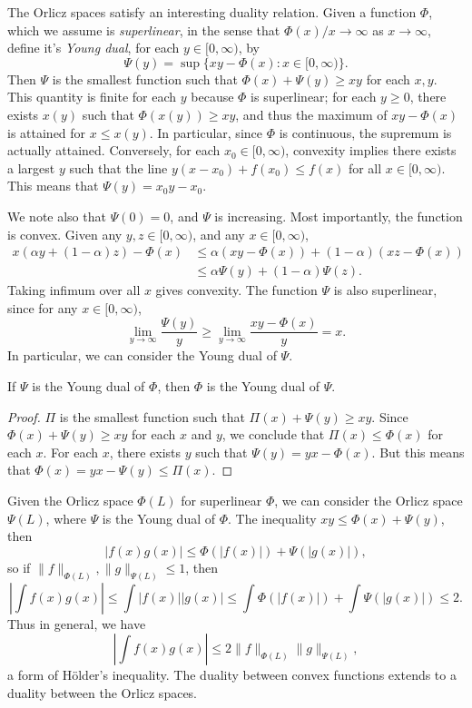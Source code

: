The Orlicz spaces satisfy an interesting duality relation. Given a function $\Phi$, which we assume is \emph{superlinear}, in the sense that $\Phi(x)/x \to \infty$ as $x \to \infty$, define it's \emph{Young dual}, for each $y \in [0,\infty)$, by
%
\[ \Psi(y) = \sup \{ xy - \Phi(x) : x \in [0,\infty) \}. \]
%
Then $\Psi$ is the smallest function such that $\Phi(x) + \Psi(y) \geq xy$ for each $x,y$. This quantity is finite for each $y$ because $\Phi$ is superlinear; for each $y \geq 0$, there exists $x(y)$ such that $\Phi(x(y)) \geq xy$, and thus the maximum of $xy - \Phi(x)$ is attained for $x \leq x(y)$. In particular, since $\Phi$ is continuous, the supremum is actually attained. Conversely, for each $x_0 \in [0,\infty)$, convexity implies there exists a largest $y$ such that the line $y(x - x_0) + f(x_0) \leq f(x)$ for all $x \in [0,\infty)$. This means that $\Psi(y) = x_0y - x_0$.

We note also that $\Psi(0) = 0$, and $\Psi$ is increasing. Most importantly, the function is convex. Given any $y,z \in [0,\infty)$, and any $x \in [0,\infty)$,
%
\begin{align*}
  x (\alpha y + (1 - \alpha) z) - \Phi(x) &\leq \alpha(xy - \Phi(x)) + (1 - \alpha)(xz - \Phi(x))\\
  &\leq \alpha \Psi(y) + (1 - \alpha) \Psi(z).
\end{align*}
%
Taking infimum over all $x$ gives convexity. The function $\Psi$ is also superlinear, since for any $x \in [0,\infty)$,
%
\[ \lim_{y \to \infty} \frac{\Psi(y)}{y} \geq \lim_{y \to \infty} \frac{xy - \Phi(x)}{y} = x. \]
%
In particular, we can consider the Young dual of $\Psi$.

\begin{lemma}
  If $\Psi$ is the Young dual of $\Phi$, then $\Phi$ is the Young dual of $\Psi$.
\end{lemma}
\begin{proof}
  $\Pi$ is the smallest function such that $\Pi(x) + \Psi(y) \geq xy$. Since $\Phi(x) + \Psi(y) \geq xy$ for each $x$ and $y$, we conclude that $\Pi(x) \leq \Phi(x)$ for each $x$. For each $x$, there exists $y$ such that $\Psi(y) = yx - \Phi(x)$. But this means that $\Phi(x) = yx - \Psi(y) \leq \Pi(x)$.
\end{proof}

Given the Orlicz space $\Phi(L)$ for superlinear $\Phi$, we can consider the Orlicz space $\Psi(L)$, where $\Psi$ is the Young dual of $\Phi$. The inequality $xy \leq \Phi(x) + \Psi(y)$, then
%
\[ |f(x) g(x)| \leq \Phi(|f(x)|) + \Psi(|g(x)|), \]
%
so if $\| f \|_{\Phi(L)}, \| g \|_{\Psi(L)} \leq 1$, then
%
\[ \left| \int f(x) g(x) \right| \leq \int |f(x)| |g(x)| \leq \int \Phi(|f(x)|) + \int \Psi(|g(x)|) \leq 2. \]
%
Thus in general, we have
%
\[ \left| \int f(x) g(x) \right| \leq 2 \| f \|_{\Phi(L)} \| g \|_{\Psi(L)}, \]
%
a form of H\"{o}lder's inequality. The duality between convex functions extends to a duality between the Orlicz spaces.

